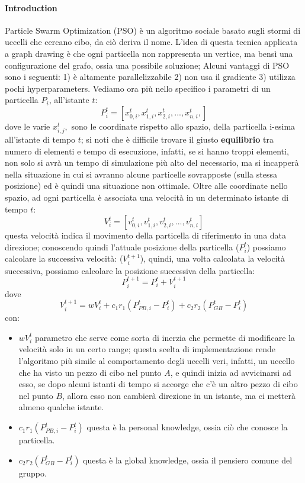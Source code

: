 \documentclass[12pt,a4paper]{report}
\begin{document}
\paragraph{Introduction} Particle Swarm Optimization (PSO) è un algoritmo sociale basato sugli stormi di uccelli che cercano cibo, da ciò deriva il nome. L'idea di questa tecnica applicata a graph drawing è che ogni particella non rappresenta un vertice, ma bensì una configurazione del grafo, ossia una possibile soluzione; Alcuni vantaggi di PSO sono i seguenti: 1) è altamente parallelizzabile 2) non usa il gradiente 3) utilizza pochi hyperparameters. Vediamo ora più nello specifico i parametri di un particella $P_i$, all'istante $t$:
$$P_i^{t} = [ x_{0, i}^{t}, x_{1, i}^{t}, x_{2, i}^{t}, ... ,x_{n, i}^{t},] $$
dove le varie $x_{i, j}^{t},$ sono le coordinate rispetto allo spazio, della particella i-esima all'istante di tempo $t$; si noti che è difficile trovare il giusto \textbf{equilibrio} tra numero di elementi e tempo di esecuzione, infatti, se si hanno troppi elementi, non solo si avrà un tempo di simulazione più alto del necessario, ma si incapperà nella situazione in cui si avranno alcune particelle sovrapposte (sulla stessa posizione) ed è quindi una situazione non ottimale. Oltre alle coordinate nello spazio, ad ogni particella è associata una velocità in un determinato istante di tempo $t$:
$$ V_{i}^{t} = [v_{0,i}^{t}, v_{1,i}^{t}, v_{2,i}^{t}, ... , v_{n,i}^{t}] $$
questa velocità indica il movimento della particella di riferimento in una data direzione; conoscendo quindi l'attuale posizione della particella ($P_i^{t}$) possiamo calcolare la successiva velocità: ($V_{i}^{t+1}$), quindi, una volta calcolata la velocità successiva, possiamo calcolare la posizione successiva della particella:
$$ P_{i}^{t+1} =  P_{i}^{t} + V_{i}^{t+1}$$
dove
$$V_{i}^{t+1} = w V_{i}^{t} + c_1 r_1(P_{PB, i}^{t} - P_{i}^{t}) + c_2 r_2 (P_{GB}^{t} - P_{i}^{t})$$
con:
\begin{itemize}
\item $w V_{i}^{t}$ parametro che serve come sorta di inerzia che permette di modificare la velocità solo in un certo range; questa scelta di implementazione rende l'algoritmo più simile al comportamento degli uccelli veri, infatti, un uccello che ha visto un pezzo di cibo nel punto $A$, e quindi inizia ad avvicinarsi ad esso, se dopo alcuni istanti di tempo si accorge che c'è un altro pezzo di cibo nel punto $B$, allora esso non cambierà direzione in un istante, ma ci metterà almeno qualche istante.
\item $c_1 r_1(P_{PB, i}^{t} - P_{i}^{t})$ questa è la personal knowledge, ossia ciò che conosce la particella.
\item $c_2 r_2 (P_{GB}^{t} - P_{i}^{t})$ questa è la global knowledge, ossia il pensiero comune del gruppo.
\end{itemize}
\end{document}
